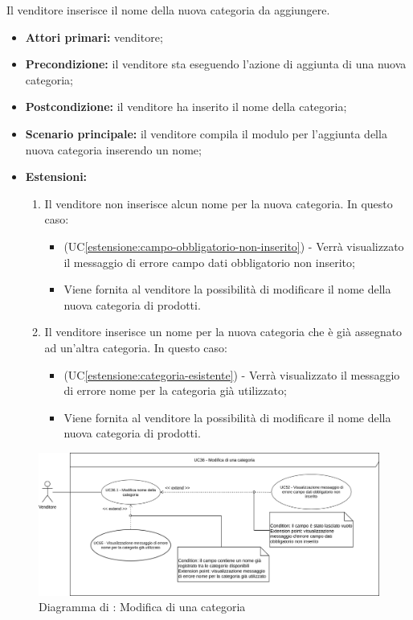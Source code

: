 \label{aggiunta-categoria.nome}

Il venditore inserisce il nome della nuova categoria da aggiungere.
\begin{itemize}
    \item \textbf{Attori primari:} venditore;
    \item \textbf{Precondizione:} il venditore sta eseguendo l'azione di aggiunta di una nuova categoria;
    \item \textbf{Postcondizione:} il venditore ha inserito il nome della categoria;
    \item \textbf{Scenario principale:} il venditore compila il modulo per l'aggiunta della nuova categoria inserendo un nome;
    \item \textbf{Estensioni:}
    \begin{enumerate}[label=\lett]
    	\item Il venditore non inserisce alcun nome per la nuova categoria. In questo caso:
    	\begin{itemize}
    		\item (UC\ref{estensione:campo-obbligatorio-non-inserito}) - Verrà visualizzato il messaggio di errore campo dati obbligatorio non inserito;
    		\item Viene fornita al venditore la possibilità di modificare il nome della nuova categoria di prodotti.
    	\end{itemize}
    	\item Il venditore inserisce un nome per la nuova categoria che è già assegnato ad un'altra categoria. In questo caso:
    	\begin{itemize}
    		\item (UC\ref{estensione:categoria-esistente}) - Verrà visualizzato il messaggio di errore nome per la categoria già utilizzato;
    		\item Viene fornita al venditore la possibilità di modificare il nome della nuova categoria di prodotti.
    	\end{itemize}
    \end{enumerate}
\end{itemize}

\label{modifica-categoria}

\begin{figure}[H]
    \centering
    \includegraphics[width=\textwidth]{Immagini/DiagrammiUC/Venditore/ModificaCategoria.png}
    \caption{Diagramma di \actualUC: Modifica di una categoria}
    \label{fig:modifica-categoria}
\end{figure}

